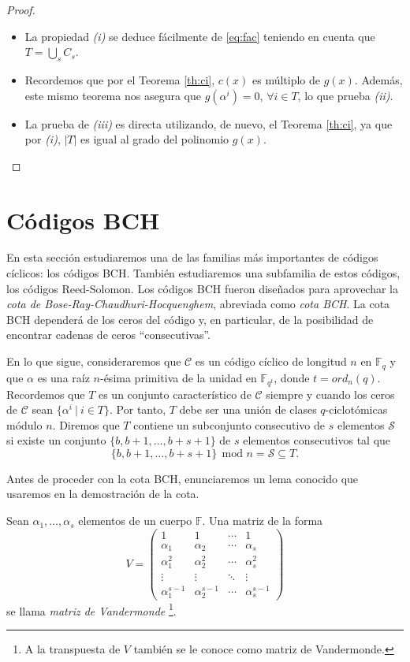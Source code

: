 \begin{proof}
  \phantom{} \\
  \begin{itemize}
    \item La propiedad \textit{(i)} se deduce fácilmente de \eqref{eq:fac} teniendo en cuenta que $T = \bigcup_{s}C_s$.
    \item Recordemos que por el Teorema \ref{th:ci}, $c(x)$ es múltiplo de $g(x)$. Además, este mismo teorema nos asegura que $g(\alpha^i) = 0$, $\forall i \in T$, lo que prueba \textit{(ii)}.
    \item La prueba de \textit{(iii)} es directa utilizando, de nuevo, el Teorema \ref{th:ci}, ya que por \textit{(i)},  $|T|$ es igual al grado del polinomio $g(x)$.
  \end{itemize}
\end{proof}

\section{Códigos BCH}

En esta sección estudiaremos una de las familias más importantes de códigos cíclicos: los códigos BCH. También estudiaremos una subfamilia de estos códigos, los códigos Reed-Solomon. Los códigos BCH fueron diseñados para aprovechar la \emph{cota de Bose-Ray-Chaudhuri-Hocquenghem}, abreviada como \emph{cota BCH}. La cota BCH dependerá de los ceros del código y, en particular, de la posibilidad de encontrar cadenas de ceros “consecutivas”.

En lo que sigue, consideraremos que $\mathcal{C}$ es un código cíclico de longitud $n$ en $\mathbb{F}_q$ y que $\alpha$ es una raíz $n$-ésima primitiva de la unidad en $\mathbb{F}_{q^t}$, donde $t = ord_n(q)$. Recordemos que $T$ es un conjunto característico de $\mathcal{C}$ siempre y cuando los ceros de $\mathcal{C}$ sean $\{\alpha^i \ | \ i \in T\}$. Por tanto, $T$ debe ser una unión de clases $q$-ciclotómicas módulo $n$. Diremos que $T$ contiene un subconjunto consecutivo de $s$ elementos $\mathcal{S}$ si existe un conjunto $\{b,b+1,\dots,b + s + 1\}$ de $s$ elementos consecutivos tal que 
$$\{b,b+1,\dots,b + s + 1\} \ \ \text{mod  }n = \mathcal{S} \subseteq T.$$

Antes de proceder con la cota BCH, enunciaremos un lema conocido que usaremos en la demostración de la cota.

Sean $\alpha_1,\dots,\alpha_s$ elementos de un cuerpo $\mathbb{F}$. Una matriz de la forma
$$
  V =
  \begin{pmatrix}
    1 & 1 & \cdots & 1 \\
    \alpha_1 & \alpha_2 & \cdots & \alpha_s \\
    \alpha_1^2 & \alpha_2^2 & \cdots & \alpha_s^2 \\
    \vdots & \vdots & \ddots & \vdots \\
    \alpha_1^{s-1} & \alpha_2^{s-1} & \cdots & \alpha_s^{s-1}
  \end{pmatrix}
$$
se llama \emph{matriz de Vandermonde} \footnote{A la transpuesta de $V$ también se le conoce como matriz de Vandermonde.}.

